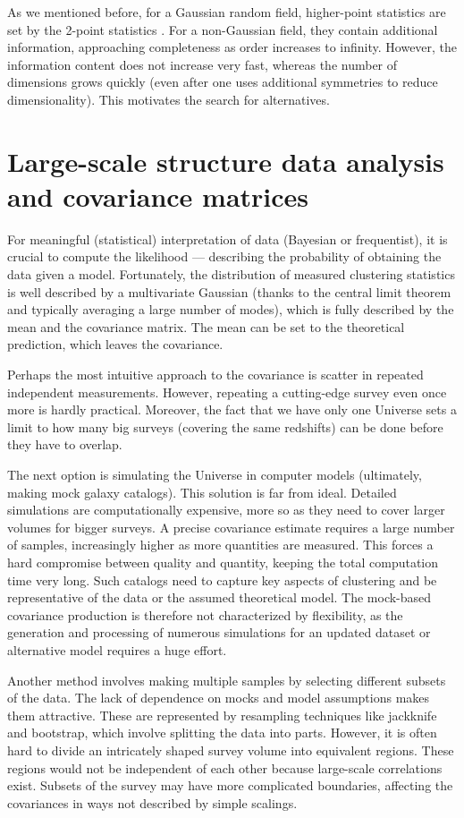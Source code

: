 As we mentioned before, for a Gaussian random field, higher-point statistics are set by the 2-point statistics \citep{isserlis}.
For a non-Gaussian field, they contain additional information, approaching completeness as order increases to infinity.
However, the information content does not increase very fast, whereas the number of dimensions grows quickly (even after one uses additional symmetries to reduce dimensionality).
This motivates the search for alternatives.

\section{Large-scale structure data analysis and covariance matrices}

For meaningful (statistical) interpretation of data (Bayesian or frequentist), it is crucial to compute the likelihood --- describing the probability of obtaining the data given a model.
Fortunately, the distribution of measured clustering statistics is well described by a multivariate Gaussian (thanks to the central limit theorem and typically averaging a large number of modes), which is fully described by the mean and the covariance matrix.
The mean can be set to the theoretical prediction, which leaves the covariance.

Perhaps the most intuitive approach to the covariance is scatter in repeated independent measurements.
However, repeating a cutting-edge survey even once more is hardly practical.
Moreover, the fact that we have only one Universe sets a limit to how many big surveys (covering the same redshifts) can be done before they have to overlap.

The next option is simulating the Universe in computer models (ultimately, making mock galaxy catalogs).
This solution is far from ideal.
Detailed simulations are computationally expensive, more so as they need to cover larger volumes for bigger surveys.
A precise covariance estimate requires a large number of samples, increasingly higher as more quantities are measured.
This forces a hard compromise between quality and quantity, keeping the total computation time very long.
Such catalogs need to capture key aspects of clustering and be representative of the data or the assumed theoretical model.
The mock-based covariance production is therefore not characterized by flexibility, as the generation and processing of numerous simulations for an updated dataset or alternative model requires a huge effort.

Another method involves making multiple samples by selecting different subsets of the data.
The lack of dependence on mocks and model assumptions makes them attractive.
These are represented by resampling techniques like jackknife and bootstrap, which involve splitting the data into parts.
However, it is often hard to divide an intricately shaped survey volume into equivalent regions.
These regions would not be independent of each other because large-scale correlations exist.
Subsets of the survey may have more complicated boundaries, affecting the covariances in ways not described by simple scalings.

